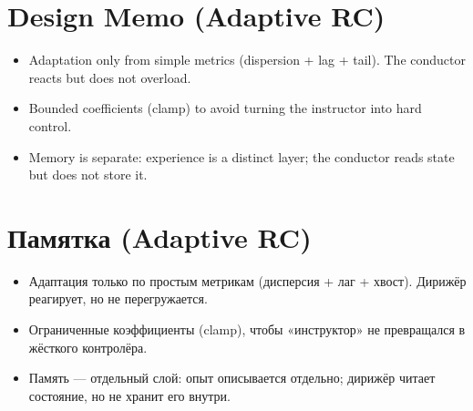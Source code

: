 ﻿\section*{Design Memo (Adaptive RC)}
\begin{itemize}
    \item Adaptation only from simple metrics (dispersion + lag + tail). The conductor reacts but does not overload.
    \item Bounded coefficients (clamp) to avoid turning the instructor into hard control.
    \item Memory is separate: experience is a distinct layer; the conductor reads state but does not store it.
\end{itemize}

\section*{Памятка (Adaptive RC)}
\begin{itemize}
    \item Адаптация только по простым метрикам (дисперсия + лаг + хвост). Дирижёр реагирует, но не перегружается.
    \item Ограниченные коэффициенты (clamp), чтобы «инструктор» не превращался в жёсткого контролёра.
    \item Память — отдельный слой: опыт описывается отдельно; дирижёр читает состояние, но не хранит его внутри.
\end{itemize}


